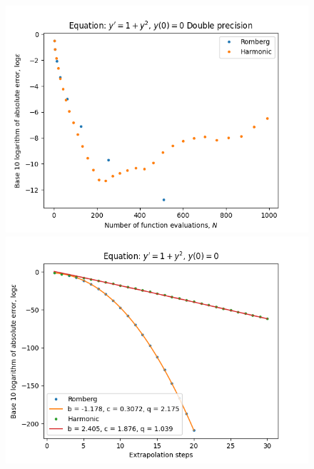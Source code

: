 \begin{figure}[H]
\centering
\begin{minipage}{0.45\textwidth}
\centering
\includegraphics[scale=0.45]{emr_plots/tangens.png}
\end{minipage}
\begin{minipage}{0.45\textwidth}
\centering
\includegraphics[scale=0.45]{emr_plots/tangens_hp_steps.png}
\end{minipage}
\end{figure}

